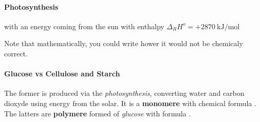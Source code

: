 \documentclass[10pt,a4paper]{article}
\begin{document}
\paragraph{Photosynthesis}

 with an energy coming from the sun with enthalpy $\Delta_R H^o = + \SI{2870}{\kilo\joule\per\mol}$

Note that mathematically, you could write 
hower it would not be chemicaly correct.

\paragraph{Glucose vs Cellulose and Starch} The former is produced via the \emph{photosynthesis}, converting water and carbon dioxyde using energy from the solar. It is a \textbf{monomere} with chemical formula . The latters are \textbf{polymere} formed of \emph{glucose} with formula .
\end{document}
